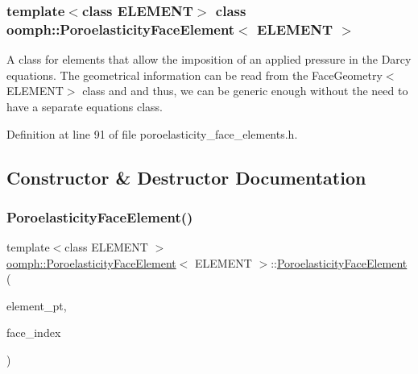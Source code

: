 \subsubsection*{template$<$class E\+L\+E\+M\+E\+NT$>$\newline
class oomph\+::\+Poroelasticity\+Face\+Element$<$ E\+L\+E\+M\+E\+N\+T $>$}

A class for elements that allow the imposition of an applied pressure in the Darcy equations. The geometrical information can be read from the Face\+Geometry$<$\+E\+L\+E\+M\+E\+N\+T$>$ class and and thus, we can be generic enough without the need to have a separate equations class. 

Definition at line 91 of file poroelasticity\+\_\+face\+\_\+elements.\+h.



\subsection{Constructor \& Destructor Documentation}
\mbox{\label{classoomph_1_1PoroelasticityFaceElement_a1eb47446a15ae0a5762685ea34757362}} 
\subsubsection{\texorpdfstring{Poroelasticity\+Face\+Element()}{PoroelasticityFaceElement()}}
{\footnotesize\ttfamily template$<$class E\+L\+E\+M\+E\+NT $>$ \\
\hyperlink{classoomph_1_1PoroelasticityFaceElement}{oomph\+::\+Poroelasticity\+Face\+Element}$<$ E\+L\+E\+M\+E\+NT $>$\+::\hyperlink{classoomph_1_1PoroelasticityFaceElement}{Poroelasticity\+Face\+Element} (\begin{DoxyParamCaption}\item[{\hyperlink{classoomph_1_1FiniteElement}{Finite\+Element} $\ast$const \&}]{element\+\_\+pt,  }\item[{const int \&}]{face\+\_\+index }\end{DoxyParamCaption})\hspace{0.3cm}{\ttfamily [inline]}}



